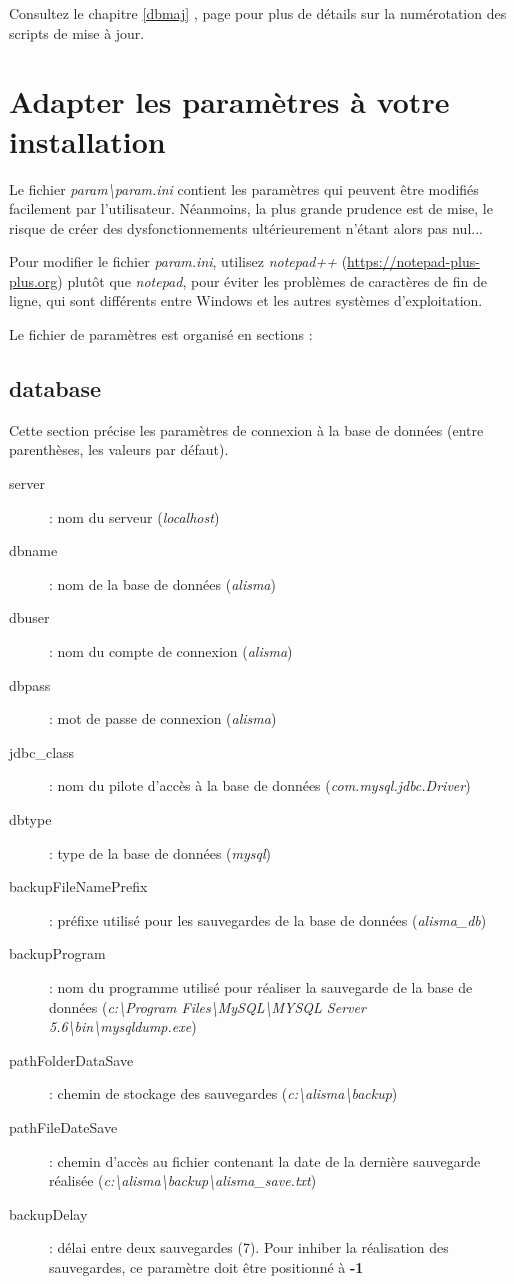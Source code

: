 Consultez le chapitre \ref{dbmaj} \textit{}, page \pageref{dbmaj} pour plus de détails sur la numérotation des scripts de mise à jour.

\section{Adapter les paramètres à votre installation}
\label{sec:param}
Le fichier \textit{param\textbackslash{}param.ini} contient les paramètres qui peuvent être modifiés facilement par l'utilisateur. Néanmoins, la plus grande prudence est de mise, le risque de créer des dysfonctionnements ultérieurement n'étant alors pas nul...

Pour modifier le fichier \textit{param.ini}, utilisez \textit{notepad++} (\url{https://notepad-plus-plus.org}) plutôt que \textit{notepad}, pour éviter les problèmes de caractères de fin de ligne, qui sont différents entre Windows et les autres systèmes d'exploitation.

Le fichier de paramètres est organisé en sections :

\subsection{database}
Cette section précise les paramètres de connexion à la base de données (entre parenthèses, les valeurs par défaut).
\begin{description}
\item [server] : nom du serveur (\textit{localhost})
\item [dbname] : nom de la base de données (\textit{alisma})
\item [dbuser] : nom du compte de connexion (\textit{alisma})
\item [dbpass] : mot de passe de connexion (\textit{alisma})
\item [jdbc\_class] : nom du pilote d'accès à la base de données (\textit{com.mysql.jdbc.Driver})
\item [dbtype] : type de la base de données (\textit{mysql})
\item [backupFileNamePrefix] : préfixe utilisé pour les sauvegardes de la base de données (\textit{alisma\_db})
\item [backupProgram] : nom du programme utilisé pour réaliser la sauvegarde de la base de données (\textit{c:\textbackslash{}Program Files\textbackslash{}MySQL\textbackslash{}MYSQL Server 5.6\textbackslash{}bin\textbackslash{}mysqldump.exe})
\item [pathFolderDataSave] : chemin de stockage des sauvegardes (\textit{c:\textbackslash{}alisma\textbackslash{}backup})
\item [pathFileDateSave] : chemin d'accès au fichier contenant la date de la dernière sauvegarde réalisée (\textit{c:\textbackslash{}alisma\textbackslash{}backup\textbackslash{}alisma\_save.txt})
\item [backupDelay] : délai entre deux sauvegardes (7). Pour inhiber la réalisation des sauvegardes, ce paramètre doit être positionné à \textbf{-1}
\end{description}

